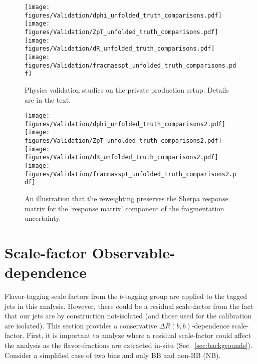 \documentclass[UKenglish,texlive=2013]{\ATLASLATEXPATH atlasdoc}
\begin{document}
\begin{figure}[htpb!]
\begin{center}
\texttt{[image: figures/Validation/dphi\_unfolded\_truth\_comparisons.pdf]}\texttt{[image: figures/Validation/ZpT\_unfolded\_truth\_comparisons.pdf]}\\
\texttt{[image: figures/Validation/dR\_unfolded\_truth\_comparisons.pdf]}\texttt{[image: figures/Validation/fracmasspt\_unfolded\_truth\_comparisons.pdf]}\\
\caption[]{Physics validation studies on the private production setup.  Details are in the text.} 
\label{fig:resultsvalidation}
\end{center}
\end{figure}

\begin{figure}[htpb!]
\begin{center}
\texttt{[image: figures/Validation/dphi\_unfolded\_truth\_comparisons2.pdf]}\texttt{[image: figures/Validation/ZpT\_unfolded\_truth\_comparisons2.pdf]}\\
\texttt{[image: figures/Validation/dR\_unfolded\_truth\_comparisons2.pdf]}\texttt{[image: figures/Validation/fracmasspt\_unfolded\_truth\_comparisons2.pdf]}\\
\caption[]{An illustration that the reweighting preserves the Sherpa response matrix for the `response matrix' component of the fragmentation uncertainty.} 
\label{fig:resultsvalidation3}
\end{center}
\end{figure}

\clearpage
\section{Scale-factor Observable-dependence}
\label{sec:app-scalefactors}

Flavor-tagging scale factors from the $b$-tagging group are applied to the tagged jets in this analysis.  However, there could be a residual scale-factor from the fact that our jets are by construction not-isolated (and those used for the calibration are isolated).  This section provides a conservative $\Delta R(b,b)$-dependence scale-factor.  First, it is important to analyze where a residual scale-factor could affect the analysis as the flavor-fractions are extracted in-situ (Sec.~\ref{sec:backgrounds}).  Consider a simplified case of two bins and only BB and non-BB (NB).\\
\end{document}
